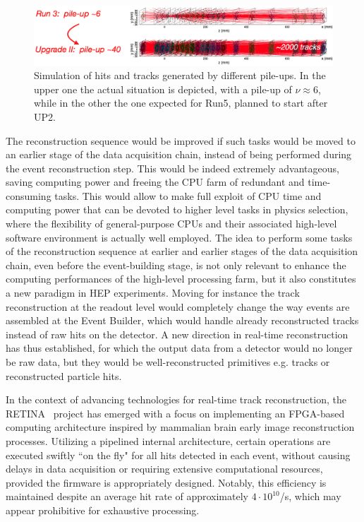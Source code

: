 \begin{figure}
    \centering
    \includegraphics[width=\textwidth]{figures/VELO_pile-up.png}
    \caption{Simulation of hits and tracks generated by different pile-ups. In the upper one the actual situation is depicted, with a pile-up of $\nu\approx 6$, while in the other the one expected for Run5, planned to start after UP2.}
    \label{fig:velo_pile-up}
\end{figure}

The reconstruction sequence would be improved if such tasks would be moved to an earlier stage of the data acquisition chain, instead of being performed during the event reconstruction step. This would be indeed extremely advantageous, saving computing power and freeing the CPU farm of redundant and time-consuming tasks. This would allow to make full exploit of CPU time and computing power that can be devoted to higher level tasks in physics selection, where the flexibility of general-purpose CPUs and their associated high-level software environment is actually well employed.
The idea to perform some tasks of the reconstruction sequence at earlier and earlier stages of the data acquisition chain, even before the event-building stage, is not only relevant to enhance the computing performances of the high-level processing farm, but it also constitutes a new paradigm in HEP experiments. Moving for instance the track reconstruction at the readout level would completely change the way events are assembled at the Event Builder, which would handle already reconstructed tracks instead of raw hits on the detector. A new direction in real-time reconstruction has thus established, for which the output data from a detector would no longer be raw data, but they would be well-reconstructed primitives e.g. tracks or reconstructed particle hits.

In the context of advancing technologies for real-time track reconstruction, the RETINA~\cite{refId0} project has emerged with a focus on implementing an FPGA-based computing architecture inspired by  mammalian brain early image reconstruction processes. Utilizing a pipelined internal architecture, certain operations are executed swiftly ``on the fly" for all hits detected in each event, without causing delays in data acquisition or requiring extensive computational resources, provided the firmware is appropriately designed. Notably, this efficiency is maintained despite an average hit rate of approximately $4 \cdot 10^{10}$/s, which may appear prohibitive for exhaustive processing.

